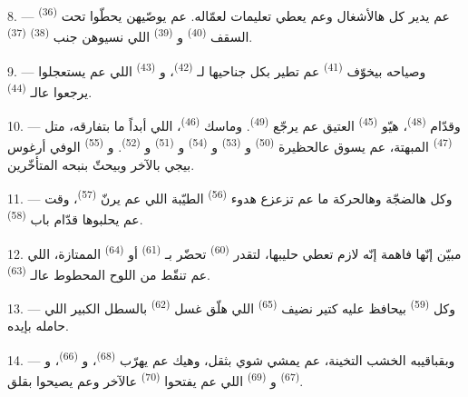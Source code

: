 8. ---  \textsuperscript{(36)} عم يدير كل
هالأشغال وعم يعطي تعليمات لعمّاله. عم يوصّيهن يحطّوا تحت السقف
 \textsuperscript{(40)} و \textsuperscript{(39)}
اللي نسيوهن جنب  \textsuperscript{(38)} 
\textsuperscript{(37)}.

9. --- وصياحه بيخوّف  \textsuperscript{(41)} عم تطير بكل
جناحيها لـ \textsuperscript{(42)}، و
\textsuperscript{(43)} اللي عم يستعجلوا يرجعوا عالـ
\textsuperscript{(44)}.

10. --- وقدّام  \textsuperscript{(48)}، هيّو
 \textsuperscript{(45)} العتيق عم يرجّع 
\textsuperscript{(49)}. وماسك  \textsuperscript{(46)}، اللي
أبداً ما بتفارقه، متل  \textsuperscript{(47)} المبهتة، عم
يسوق عالحظيرة  \textsuperscript{(50)}
و \textsuperscript{(53)} و \textsuperscript{(54)}
و \textsuperscript{(51)} و
\textsuperscript{(52)}. و \textsuperscript{(55)} الوفي أرغوس
بيجي بالآخر وبيحثّ بنبحه المتأخّرين.

11. --- وكل هالضجّة وهالحركة ما عم تزعزع هدوء 
\textsuperscript{(56)} الطيّبة اللي عم يرنّ 
\textsuperscript{(57)}، وقت عم يحلبوها قدّام باب 
\textsuperscript{(58)}.

12. مبيّن إنّها فاهمة إنّه لازم تعطي حليبها، لتقدر  \textsuperscript{(60)} تحضّر  بـ
\textsuperscript{(61)} أو  \textsuperscript{(64)} الممتازة،
اللي عم تنقّط من اللوح المحطوط عالـ
\textsuperscript{(63)}.

13. --- وكل  \textsuperscript{(59)} بيحافظ عليه كتير
نضيف  \textsuperscript{(65)} اللي هلّق غسل
 \textsuperscript{(62)} بالسطل الكبير اللي حامله
بإيده.

\VUsaut{3.0mm}
\VUsaut{3.0mm}

14. --- وبقباقيبه الخشب التخينة، عم يمشي شوي بثقل، وهيك عم يهرّب
 \textsuperscript{(68)}، و
\textsuperscript{(66)}، و \textsuperscript{(67)}
و \textsuperscript{(69)} اللي عم يفتحوا 
\textsuperscript{(70)} عالآخر وعم يصيحوا بقلق.

